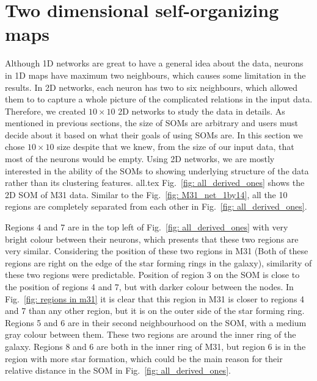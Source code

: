  \section{Two dimensional self-organizing maps}
 \label{sec: 2d_cluster}
    Although 1D networks are great to have a general idea about the data, neurons in 1D maps have maximum two neighbours, which causes some limitation in the results.
    In 2D networks, each neuron has two to six neighbours, which allowed them to to capture a whole picture of the complicated relations in the input data.
    Therefore, we created $10\times10$ 2D networks to study the data in details.
    As mentioned in previous sections, the size of SOMs are arbitrary and users must decide about it based on what their goals of using SOMs are.
    In this section we chose $10\times10$ size despite that we knew, from the size of our input data, that most of the neurons would be empty.
    Using 2D networks, we are mostly interested in the ability of the SOMs to showing underlying structure of the data rather than its clustering features.
    {all.tex}
    Fig.~\ref{fig: all_derived_ones} shows the 2D SOM of M31 data.
    Similar to the Fig.~\ref{fig: M31_net_1by14}, all the 10 regions are completely separated from each other in Fig.~\ref{fig: all_derived_ones}.
    
    Regions 4 and 7 are in the top left of Fig.~\ref{fig: all_derived_ones} with very bright colour between their neurons, which presents that these two regions are very similar.
    Considering the position of these two regions in M31 (Both of these regions are right on the edge of the star forming rings in the galaxy), similarity of these two regions were predictable.
    Position of region 3 on the SOM is close to the position of regions 4 and 7, but with darker colour between the nodes. 
    In Fig.~\ref{fig: regions in m31} it is clear that this region in M31 is closer to regions 4 and 7 than any other region, but it is on the outer side of the star forming ring.
    Regions 5 and 6 are in their second neighbourhood on the SOM, with a medium gray colour between them.
    These two regions are around the inner ring of the galaxy.
    Regions 8 and 6 are both in the inner ring of M31, but region 6 is in the region with more star formation, which could be the main reason for their relative distance in the SOM in Fig.~\ref{fig: all_derived_ones}. 
    
